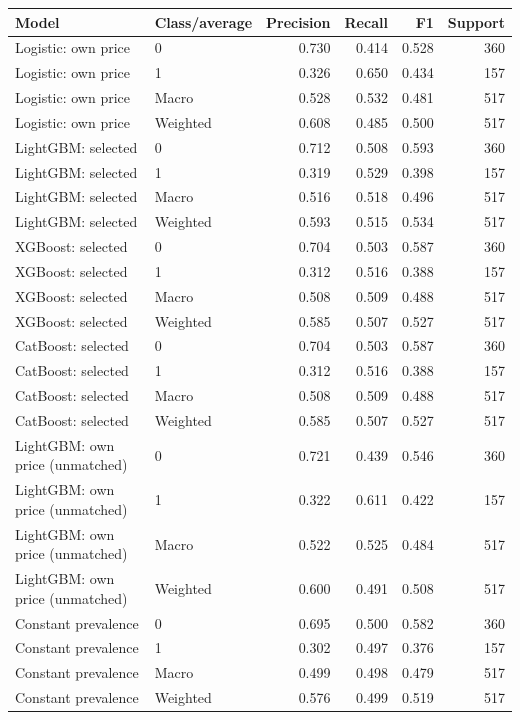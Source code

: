 \begin{longtable}{@{}p{.34\linewidth}p{.15\linewidth}rrrr@{}}
\toprule Model & Class/average & Precision & Recall & F1 & Support\\\midrule\endhead
Logistic: own price & 0 & 0.730 & 0.414 & 0.528 & 360\\
Logistic: own price & 1 & 0.326 & 0.650 & 0.434 & 157\\
Logistic: own price & Macro & 0.528 & 0.532 & 0.481 & 517\\
Logistic: own price & Weighted & 0.608 & 0.485 & 0.500 & 517\\
LightGBM: selected & 0 & 0.712 & 0.508 & 0.593 & 360\\
LightGBM: selected & 1 & 0.319 & 0.529 & 0.398 & 157\\
LightGBM: selected & Macro & 0.516 & 0.518 & 0.496 & 517\\
LightGBM: selected & Weighted & 0.593 & 0.515 & 0.534 & 517\\
XGBoost: selected & 0 & 0.704 & 0.503 & 0.587 & 360\\
XGBoost: selected & 1 & 0.312 & 0.516 & 0.388 & 157\\
XGBoost: selected & Macro & 0.508 & 0.509 & 0.488 & 517\\
XGBoost: selected & Weighted & 0.585 & 0.507 & 0.527 & 517\\
CatBoost: selected & 0 & 0.704 & 0.503 & 0.587 & 360\\
CatBoost: selected & 1 & 0.312 & 0.516 & 0.388 & 157\\
CatBoost: selected & Macro & 0.508 & 0.509 & 0.488 & 517\\
CatBoost: selected & Weighted & 0.585 & 0.507 & 0.527 & 517\\
LightGBM: own price (unmatched) & 0 & 0.721 & 0.439 & 0.546 & 360\\
LightGBM: own price (unmatched) & 1 & 0.322 & 0.611 & 0.422 & 157\\
LightGBM: own price (unmatched) & Macro & 0.522 & 0.525 & 0.484 & 517\\
LightGBM: own price (unmatched) & Weighted & 0.600 & 0.491 & 0.508 & 517\\
Constant prevalence & 0 & 0.695 & 0.500 & 0.582 & 360\\
Constant prevalence & 1 & 0.302 & 0.497 & 0.376 & 157\\
Constant prevalence & Macro & 0.499 & 0.498 & 0.479 & 517\\
Constant prevalence & Weighted & 0.576 & 0.499 & 0.519 & 517\\
\bottomrule\end{longtable}\endgroup

